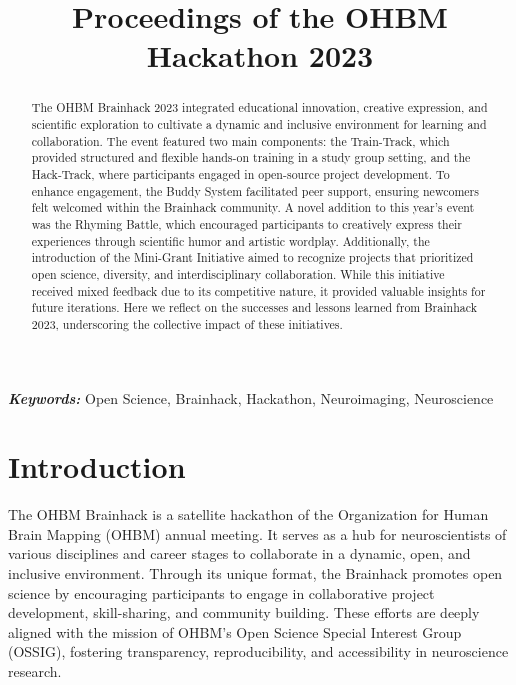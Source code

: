 \documentclass{article}
\title{Proceedings of the OHBM Hackathon 2023}
\date{}
\begin{document}
\maketitle

\begin{abstract}
    The OHBM Brainhack 2023 integrated educational innovation, creative expression, and scientific exploration to cultivate a dynamic and inclusive environment for learning and collaboration. The event featured two main components: the Train-Track, which provided structured and flexible hands-on training in a study group setting, and the Hack-Track, where participants engaged in open-source project development. To enhance engagement, the Buddy System facilitated peer support, ensuring newcomers felt welcomed within the Brainhack community. A novel addition to this year’s event was the Rhyming Battle, which encouraged participants to creatively express their experiences through scientific humor and artistic wordplay. Additionally, the introduction of the Mini-Grant Initiative aimed to recognize projects that prioritized open science, diversity, and interdisciplinary collaboration. While this initiative received mixed feedback due to its competitive nature, it provided valuable insights for future iterations. Here we reflect on the successes and lessons learned from Brainhack 2023, underscoring the collective impact of these initiatives.
\end{abstract}

\textbf{\textit{Keywords:}} Open Science, Brainhack, Hackathon, Neuroimaging, Neuroscience 

\section{Introduction}

The OHBM Brainhack is a satellite hackathon of the Organization for Human Brain Mapping (OHBM) annual meeting.
It serves as a hub for neuroscientists of various disciplines and career stages to collaborate in a dynamic, open, and inclusive environment.
Through its unique format, the Brainhack promotes open science by encouraging participants to engage in collaborative project development, skill-sharing, and community building.
These efforts are deeply aligned with the mission of OHBM’s Open Science Special Interest Group (OSSIG), fostering transparency, reproducibility, and accessibility in neuroscience research.
\end{document}
